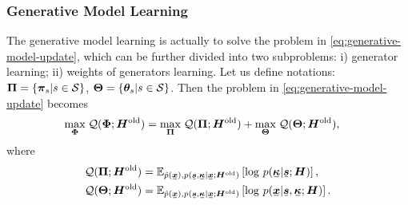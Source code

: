 \documentclass[letterpaper]{article} %
\newcommand{\ubar}[1]{\mkern2mu\underline{\mkern-2mu #1\mkern-2mu}\mkern2mu}
\newcommand{\ubm}[1]{\ubar{\bm{#1}}}
\begin{document}
\subsubsection{Generative Model Learning}
The generative model learning is actually to solve the problem in \eqref{eq:generative-model-update}, which can be further divided into two subproblems: i) generator learning; ii) weights of generators learning. Let us define notations:
$\bm{\Pi} = \left\{  \bm{\pi}_{s}| s\in \mathcal{S} \right\}$, $\bm{\Theta}=\left\{ \bm{\theta}_s| s\in \mathcal{S} \right\}$. 
Then the problem in \eqref{eq:generative-model-update} becomes
\begin{align}\label{eq:sub-gm}
  &\underset{\bm{\Phi}}{\max}\; \mathcal{Q}(\bm{\Phi}; \bm{H}^{\mathrm{old}}) = \underset{\bm{\Pi}}{\max}\; \mathcal{Q}(\bm{\Pi}; \bm{H}^{\mathrm{old}}) + \underset{\bm{\Theta}}{\max}\; \mathcal{Q}(\bm{\Theta}; \bm{H}^{\mathrm{old}}),
\end{align}
where
\begin{align}
  \Qq(\bm{\Pi}; \bm{H}^{\mathrm{old}})  &=\EE_{\hat{p}(\ubm{x}),p(\ubm{s},\ubm{\kappa}| \ubm{x}; \bm{H}^{\mathrm{old}})}\left[  \log\,p(\ubm{\kappa}| \ubm{s}; \bm{H})\right], \\
  \Qq(\bm{\Theta}; \bm{H}^{\mathrm{old}}) &=\EE_{\hat{p}(\ubm{x}),p(\ubm{s},\ubm{\kappa}| \ubm{x}; \bm{H}^{\mathrm{old}})}\left[  \log\,p(\ubm{x}| \ubm{s},\ubm{\kappa}; \bm{H})\right].
\end{align}
\end{document}
